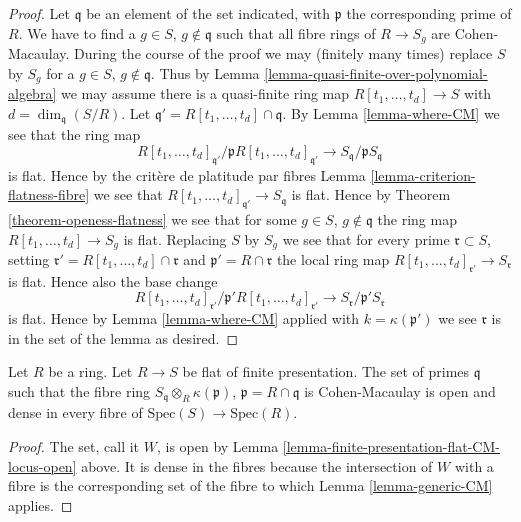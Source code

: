\begin{proof}
Let $\mathfrak q$ be an element of the set indicated, with
$\mathfrak p$ the corresponding prime of $R$.
We have to find a $g \in S$, $g \not \in \mathfrak q$ such that
all fibre rings of $R \to S_g$ are Cohen-Macaulay.
During the course of the proof we may (finitely many times)
replace $S$ by $S_g$ for a $g \in S$, $g \not \in \mathfrak q$.
Thus by Lemma \ref{lemma-quasi-finite-over-polynomial-algebra} 
we may assume there is a quasi-finite ring map
$R[t_1, \ldots, t_d] \to S$ with $d = \dim_{\mathfrak q}(S/R)$.
Let $\mathfrak q' = R[t_1, \ldots, t_d] \cap \mathfrak q$.
By Lemma \ref{lemma-where-CM} we see that the ring map
$$
R[t_1, \ldots, t_d]_{\mathfrak q'} /
\mathfrak p R[t_1, \ldots, t_d]_{\mathfrak q'}
\longrightarrow
S_{\mathfrak q}/\mathfrak p S_{\mathfrak q}
$$
is flat. Hence by the crit\`ere de platitude par fibres
Lemma \ref{lemma-criterion-flatness-fibre} we see that
$R[t_1, \ldots, t_d]_{\mathfrak q'} \to S_{\mathfrak q}$ is flat.
Hence by Theorem \ref{theorem-openess-flatness} we see that
for some $g \in S$, $g \not \in \mathfrak q$ the ring map
$R[t_1, \ldots, t_d] \to S_g$ is flat. Replacing $S$ by $S_g$
we see that for every prime $\mathfrak r \subset S$,
setting $\mathfrak r' = R[t_1, \ldots, t_d] \cap \mathfrak r$
and $\mathfrak p' = R \cap \mathfrak r$
the local ring map
$R[t_1, \ldots, t_d]_{\mathfrak r'} \to S_{\mathfrak r}$ is flat.
Hence also the base change
$$
R[t_1, \ldots, t_d]_{\mathfrak r'} /
\mathfrak p' R[t_1, \ldots, t_d]_{\mathfrak r'}
\longrightarrow
S_{\mathfrak r}/\mathfrak p' S_{\mathfrak r}
$$
is flat. Hence by Lemma \ref{lemma-where-CM} applied with
$k = \kappa(\mathfrak p')$ we see
$\mathfrak r$ is in the set of the lemma
as desired.
\end{proof}

\begin{lemma}
\label{lemma-generic-CM-flat-finite-presentation}
Let $R$ be a ring. Let $R \to S$ be flat of finite presentation.
The set of primes $\mathfrak q$ such that the fibre ring
$S_{\mathfrak q} \otimes_R \kappa(\mathfrak p)$,
$\mathfrak p = R \cap \mathfrak q$ is Cohen-Macaulay
is open and dense in every fibre of $\text{Spec}(S) \to \text{Spec}(R)$.
\end{lemma}

\begin{proof}
The set, call it $W$, is open by
Lemma \ref{lemma-finite-presentation-flat-CM-locus-open} above.
It is dense in the fibres because the intersection of $W$
with a fibre is the corresponding set of the fibre
to which Lemma \ref{lemma-generic-CM} applies.
\end{proof}


